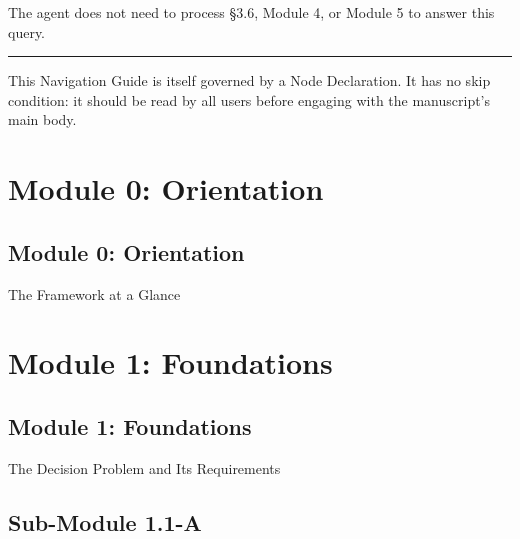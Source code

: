 \documentclass[
  11pt,
  a4paper,
  twoside,
  openright]{scrbook}
\begin{document}
The agent does not need to process §3.6, Module 4, or Module 5 to answer
this query.

\begin{center}\rule{0.5\linewidth}{0.5pt}\end{center}

\begin{tcolorbox}[enhanced jigsaw, arc=.35mm, bottomrule=.15mm, bottomtitle=1mm, breakable, colback=white, colbacktitle=quarto-callout-important-color!10!white, colframe=quarto-callout-important-color-frame, coltitle=black, left=2mm, leftrule=.75mm, opacityback=0, opacitybacktitle=0.6, rightrule=.15mm, title=\textcolor{quarto-callout-important-color}{\faExclamation}\hspace{0.5em}{Important}, titlerule=0mm, toprule=.15mm, toptitle=1mm]

This Navigation Guide is itself governed by a Node Declaration. It has
no skip condition: it should be read by all users before engaging with
the manuscript's main body.

\end{tcolorbox}

\part{Module 0: Orientation}

\chapter{Module 0: Orientation}\label{module-0-orientation-1}

The Framework at a Glance

\hfill\break

\part{Module 1: Foundations}

\chapter{Module 1: Foundations}\label{module-1-foundations-1}

The Decision Problem and Its Requirements

\hfill\break

\chapter{Sub-Module 1.1-A}\label{sub-module-1.1-a}
\end{document}
